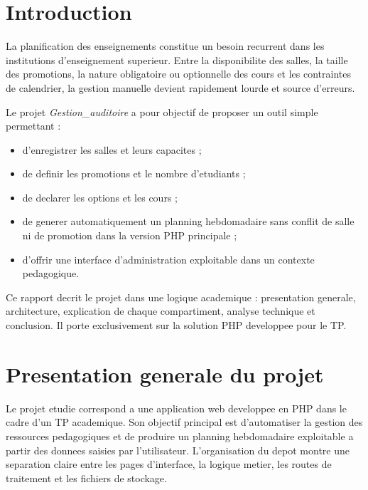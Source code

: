 \documentclass[12pt,a4paper]{article}
\begin{document}
\tableofcontents
\clearpage

\begin{abstract}
Le projet \textit{Gestion\_auditoire} est une application academique de gestion des salles, des promotions, des options et des cours, avec une fonctionnalite centrale de generation automatique d'un planning hebdomadaire. Le travail etudie ici correspond au TP du cours de programmation Web PHP et repose sur une persistance par fichiers JSON, conformement a la consigne de l'assistant encadrant plutot que sur une base de donnees classique. Ce rapport presente la structure du projet, decrit chaque compartiment logiciel, explique les principaux flux fonctionnels et analyse les qualites, limites et perspectives d'amelioration du systeme.
\end{abstract}

\section{Introduction}
La planification des enseignements constitue un besoin recurrent dans les institutions d'enseignement superieur. Entre la disponibilite des salles, la taille des promotions, la nature obligatoire ou optionnelle des cours et les contraintes de calendrier, la gestion manuelle devient rapidement lourde et source d'erreurs.

Le projet \textit{Gestion\_auditoire} a pour objectif de proposer un outil simple permettant :
\begin{itemize}
    \item d'enregistrer les salles et leurs capacites ;
    \item de definir les promotions et le nombre d'etudiants ;
    \item de declarer les options et les cours ;
    \item de generer automatiquement un planning hebdomadaire sans conflit de salle ni de promotion dans la version PHP principale ;
    \item d'offrir une interface d'administration exploitable dans un contexte pedagogique.
\end{itemize}

Ce rapport decrit le projet dans une logique academique : presentation generale, architecture, explication de chaque compartiment, analyse technique et conclusion. Il porte exclusivement sur la solution PHP developpee pour le TP.

\section{Presentation generale du projet}
Le projet etudie correspond a une application web developpee en PHP dans le cadre d'un TP academique. Son objectif principal est d'automatiser la gestion des ressources pedagogiques et de produire un planning hebdomadaire exploitable a partir des donnees saisies par l'utilisateur. L'organisation du depot montre une separation claire entre les pages d'interface, la logique metier, les routes de traitement et les fichiers de stockage.
\end{document}
